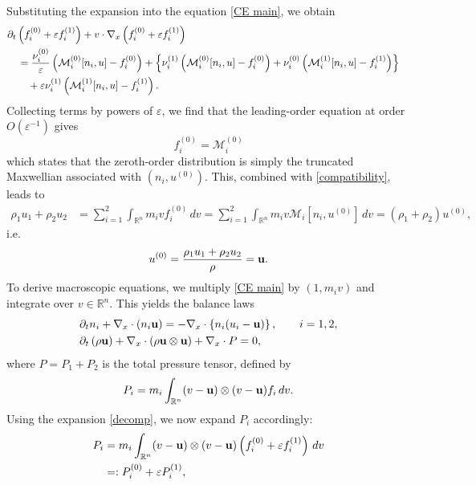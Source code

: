 \documentclass[10pt,reqno]{amsart}
\numberwithin{equation}{section}
\newcommand{\R}{\mathbb R}
\newcommand{\intr}{\int_{\R^n}}
\newcommand{\ve}{\varepsilon}
\begin{document}
Substituting the expansion  into the equation \eqref{CE main}, we obtain
\begin{align}\label{e eqn}\begin{split}
&\partial_t \left( f_i^{(0)} + \varepsilon f_i^{(1)} \right) + v \cdot \nabla_x \left( f_i^{(0)} + \varepsilon f_i^{(1)} \right)\cr 
&\quad = \frac{\nu_i^{(0)}}{\varepsilon} \left( \mathcal{M}^{(0)}_i[n_i, u] - f_i^{(0)}  \right)+\left\{\nu_i^{(1)}\left(\mathcal{M}^{(0)}_i[n_i, u] - f_i^{(0)} \right)+\nu_i^{(0)} \left(\mathcal{M}^{(1)}_i[n_i, u]- f_i^{(1)}\right)\right\}\cr 
&\qquad +\ve \nu_i^{(1)}\left(\mathcal{M}^{(1)}_i[n_i, u]- f_i^{(1)}\right).
\end{split}\end{align}
Collecting terms by powers of $\varepsilon$, we find that the leading-order equation at order $O(\varepsilon^{-1})$ gives
\begin{equation}\label{e-1}
f_i^{(0)} = \mathcal{M}^{(0)}_i
\end{equation}
which states that the zeroth-order distribution is simply the truncated Maxwellian associated with $(n_i, u^{(0)})$. This, combined with \eqref{compatibility}, leads to
\begin{align*}
\rho_1u_1+\rho_2u_2&=\sum_{i=1}^2\intr m_ivf_i^{(0)}\,dv=\sum_{i=1}^2 \intr m_iv \mathcal{M}_i[n_i,u^{(0)}]\,dv=(\rho_1+\rho_2) u^{(0)},
\end{align*}
i.e. 
\begin{equation}\label{u^0}
u^{(0)}=\frac{\rho_1u_1+\rho_2u_2}{\rho}={\bf{u}}.
\end{equation} 
To derive macroscopic equations, we multiply \eqref{CE main} by $(1, m_i v)$ and integrate over $v \in \mathbb{R}^n$. This yields the balance laws
\begin{align}\label{balance}
\begin{split}
&\partial_t n_i + \nabla_x \cdot (n_i {\bf{u}}) = -\nabla_x \cdot \left\{ n_i (u_i - {\bf{u}}) \right\}, \qquad i = 1, 2, \\
&\partial_t \left( \rho {\bf{u}} \right) + \nabla_x \cdot \left( \rho {\bf{u}} \otimes {\bf{u}}\right) + \nabla_x \cdot P = 0,
\end{split}
\end{align}
where $P = P_1 + P_2$ is the total pressure tensor, defined by
\[
P_i = m_i \int_{\mathbb{R}^n} (v - {\bf{u}}) \otimes (v - {\bf{u}}) f_i\,dv.
\]
Using the expansion \eqref{decomp}, we now expand $P_i$ accordingly:
\begin{align*}
P_i &= m_i \int_{\mathbb{R}^n} (v - {\bf{u}}) \otimes (v - {\bf{u}}) \left( f_i^{(0)} + \varepsilon f_i^{(1)} \right) \,dv \\
&=: P_i^{(0)} + \varepsilon P_i^{(1)},
\end{align*}
\end{document}
